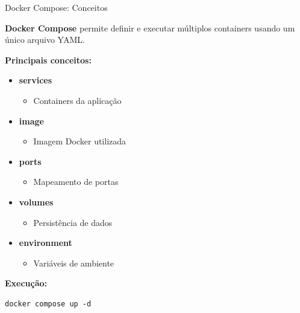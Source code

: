 \documentclass{beamer}
\begin{document}
\begin{frame}[fragile]{Docker Compose: Conceitos}

\textbf{Docker Compose} permite definir e executar múltiplos containers usando um único arquivo YAML.

\vspace{0.4cm}

\textbf{Principais conceitos:}

\begin{itemize}
    \item \textbf{services}
    \begin{itemize}
        \item Containers da aplicação
    \end{itemize}

    \item \textbf{image}
    \begin{itemize}
        \item Imagem Docker utilizada
    \end{itemize}

    \item \textbf{ports}
    \begin{itemize}
        \item Mapeamento de portas
    \end{itemize}

    \item \textbf{volumes}
    \begin{itemize}
        \item Persistência de dados
    \end{itemize}

    \item \textbf{environment}
    \begin{itemize}
        \item Variáveis de ambiente
    \end{itemize}
\end{itemize}

\vspace{0.4cm}

\textbf{Execução:}

\begin{verbatim}
docker compose up -d
\end{verbatim}

\end{frame}
\end{document}
